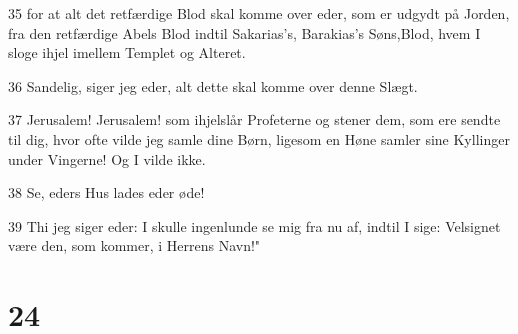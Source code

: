 \par 35 for at alt det retfærdige Blod skal komme over eder, som er udgydt på Jorden, fra den retfærdige Abels Blod indtil Sakarias's, Barakias's Søns,Blod, hvem I sloge ihjel imellem Templet og Alteret.
\par 36 Sandelig, siger jeg eder, alt dette skal komme over denne Slægt.
\par 37 Jerusalem! Jerusalem! som ihjelslår Profeterne og stener dem, som ere sendte til dig, hvor ofte vilde jeg samle dine Børn, ligesom en Høne samler sine Kyllinger under Vingerne! Og I vilde ikke.
\par 38 Se, eders Hus lades eder øde!
\par 39 Thi jeg siger eder: I skulle ingenlunde se mig fra nu af, indtil I sige: Velsignet være den, som kommer, i Herrens Navn!"

\chapter{24}

